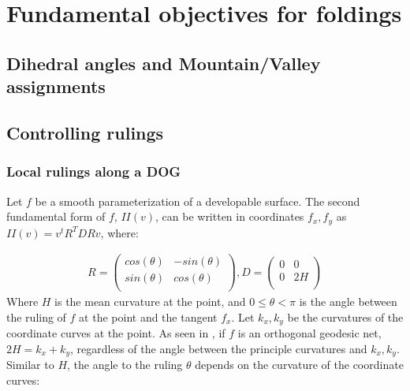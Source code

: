 \section{Fundamental objectives for foldings} \label{sec:objectives}

\subsection{Dihedral angles and Mountain/Valley assignments} \label{sec:dihedral}

\subsection{Controlling rulings} \label{sec:rulings}
\subsubsection{Local rulings along a DOG} \label{sec:dog_rulings}
Let $f$ be a smooth parameterization of a developable surface. The second fundamental form of $f$, $II(v)$, can be written in coordinates $f_x,f_y$ as  $II(v)=v^tR^TDRv$, where:

\begin{equation} \label{second_smooth}
\begin{split}
R=\begin{pmatrix}cos(\theta) & -sin(\theta)\\
sin(\theta) &  cos(\theta)\\
\end{pmatrix},
D=\begin{pmatrix}0 & 0\\
0 &  2H\\
\end{pmatrix}
\end{split}
\end{equation}
Where $H$ is the mean curvature at the point, and $0 \leq \theta < \pi$ is the angle between the ruling of $f$ at the point and the tangent $f_x$. Let $k_x,k_y$ be the curvatures of the coordinate curves at the point. As seen in \cite{rabi2018shape}, if $f$ is an orthogonal geodesic net, $2H = k_x+k_y$, regardless of the angle between the principle curvatures and $k_x,k_y$. Similar to $H$, the angle to the ruling $\theta$ depends on the curvature of the coordinate curves:

